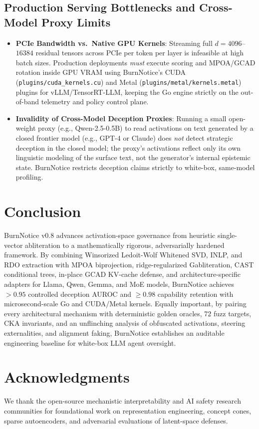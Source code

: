 \documentclass{article}
\begin{document}
\subsection{Production Serving Bottlenecks and Cross-Model Proxy Limits}
\begin{itemize}
    \item \textbf{PCIe Bandwidth vs.\ Native GPU Kernels}: Streaming full $d=4096$--$16384$ residual tensors across PCIe per token per layer is infeasible at high batch sizes. Production deployments \textit{must} execute scoring and MPOA/GCAD rotation inside GPU VRAM using BurnNotice's CUDA (\texttt{plugins/cuda\_kernels.cu}) and Metal (\texttt{plugins/metal/kernels.metal}) plugins for vLLM/TensorRT-LLM, keeping the Go engine strictly on the out-of-band telemetry and policy control plane.
    \item \textbf{Invalidity of Cross-Model Deception Proxies}: Running a small open-weight proxy (e.g., Qwen-2.5-0.5B) to read activations on text generated by a closed frontier model (e.g., GPT-4 or Claude) does \textit{not} detect strategic deception in the closed model; the proxy's activations reflect only its own linguistic modeling of the surface text, not the generator's internal epistemic state. BurnNotice restricts deception claims strictly to white-box, same-model profiling.
\end{itemize}

\section{Conclusion}

BurnNotice v0.8 advances activation-space governance from heuristic single-vector abliteration to a mathematically rigorous, adversarially hardened framework. By combining Winsorized Ledoit-Wolf Whitened SVD, INLP, and RDO extraction with MPOA biprojection, ridge-regularized Gabliteration, CAST conditional trees, in-place GCAD KV-cache defense, and architecture-specific adapters for Llama, Qwen, Gemma, and MoE models, BurnNotice achieves $>0.95$ controlled deception AUROC and $\ge 0.98$ capability retention with microsecond-scale Go and CUDA/Metal kernels. Equally important, by pairing every architectural mechanism with deterministic golden oracles, 72 fuzz targets, CKA invariants, and an unflinching analysis of obfuscated activations, steering externalities, and alignment faking, BurnNotice establishes an auditable engineering baseline for white-box LLM agent oversight.

\section*{Acknowledgments}
We thank the open-source mechanistic interpretability and AI safety research communities for foundational work on representation engineering, concept cones, sparse autoencoders, and adversarial evaluations of latent-space defenses.
\end{document}

